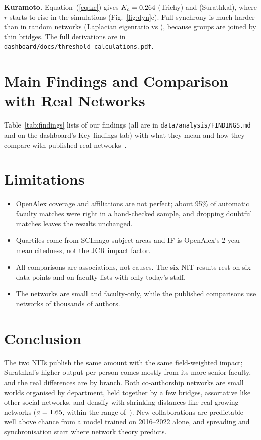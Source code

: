 \documentclass[10pt,twocolumn,a4paper]{article}
\begin{document}
\textbf{Kuramoto.} Equation~(\ref{eq:kc}) gives $K_c=0.264$ (Trichy) and \KcS{} (Surathkal), where $r$ starts to rise in the simulations
(Fig.~\ref{fig:dyn}c). Full synchrony is much harder than in random networks (Laplacian eigenratio \eigR{} vs \eigRw), because groups are joined by
thin bridges. The full derivations are in \texttt{dashboard/docs/threshold\_calculations.pdf}.

\section{Main Findings and Comparison with Real Networks}
\label{sec:findings}
Table~\ref{tab:findings} lists \nPicked{} of our \nFindings{} findings (all are in \texttt{data/analysis/FINDINGS.md} and on the dashboard's Key
findings tab) with what they mean and how they compare with published real networks~\cite{newman2001, newman2002, barabasi2002, leskovec2005, libennowell2007}.


\section{Limitations}
\label{sec:limits}
\begin{itemize}
\item OpenAlex coverage and affiliations are not perfect; about 95\% of automatic faculty matches were right in a hand-checked sample, and dropping
doubtful matches leaves the results unchanged.
\item Quartiles come from SCImago subject areas and IF is OpenAlex's 2-year mean citedness, not the JCR impact factor.
\item All comparisons are associations, not causes. The six-NIT results rest on six data points and on faculty lists with only today's staff.
\item The networks are small and faculty-only, while the published comparisons use networks of thousands of authors.
\end{itemize}

\section{Conclusion}
\label{sec:conclusion}
The two NITs publish the same amount with the same field-weighted impact; Surathkal's higher output per person comes mostly from its more senior
faculty, and the real differences are by branch. Both co-authorship networks are small worlds organised by department, held together by a few
bridges, assortative like other social networks, and densify with shrinking distances like real growing networks ($a=1.65$, within the range
of~\cite{leskovec2005}). New collaborations are predictable well above chance from a model trained on 2016--2022 alone, and spreading and
synchronisation start where network theory predicts.
\end{document}
